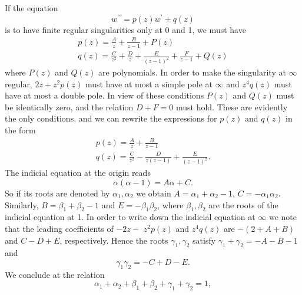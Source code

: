 If the equation
\begin{equation*}
w ^ {\prime \prime} = p (z) w ^ {\prime} + q (z)
\end{equation*}
is to have finite regular singularities only at 0 and 1, we must have
\begin{equation*}
\begin{array}{l} p (z) = \frac {A}{z} + \frac {B}{z - 1} + P (z) \\ q (z) = \frac {C}{z ^ {2}} + \frac {D}{z} + \frac {E}{(z - 1) ^ {2}} + \frac {F}{z - 1} + Q (z) \end{array}
\end{equation*}
where $P(z)$ and $Q(z)$ are polynomials. In order to make the singularity at $\infty$ regular, $2z + z^{2}p(z)$ must have at most a simple pole at $\infty$ and $z^{4}q(z)$ must have at most a double pole. In view of these conditions $P(z)$ and $Q(z)$ must be identically zero, and the relation $D + F = 0$ must hold. These are evidently the only conditions, and we can rewrite the expressions for $p(z)$ and $q(z)$ in the form
\begin{equation*}
\begin{array}{l} p (z) = \frac {A}{z} + \frac {B}{z - 1} \\ q (z) = \frac {C}{z ^ {2}} - \frac {D}{z (z - 1)} + \frac {E}{(z - 1) ^ {2}}. \end{array}
\end{equation*}
The indicial equation at the origin reads
\begin{equation*}
\alpha (\alpha - 1) = A \alpha + C.
\end{equation*}
So if its roots are denoted by $\alpha_{1}, \alpha_{2}$ we obtain $A = \alpha_{1} + \alpha_{2} - 1$, $C = -\alpha_{1}\alpha_{2}$. Similarly, $B = \beta_{1} + \beta_{2} - 1$ and $E = -\beta_{1}\beta_{2}$, where $\beta_{1}, \beta_{2}$ are the roots of the indicial equation at 1. In order to write down the indicial equation at $\infty$ we note that the leading coefficients of $-2z -$
$z^{2}p(z)$ and $z^{4}q(z)$ are $-(2+A+B)$ and $C-D+E$, respectively. Hence the roots $\gamma_{1},\gamma_{2}$ satisfy $\gamma_{1}+\gamma_{2}=-A-B-1$ and
\begin{equation*}
\gamma_ {1} \gamma_ {2} = - C + D - E.
\end{equation*}
We conclude at the relation
\begin{equation*}
\alpha_ {1} + \alpha_ {2} + \beta_ {1} + \beta_ {2} + \gamma_ {1} + \gamma_ {2} = 1,\tag{22}\label{eq:8.22}
\end{equation*}
